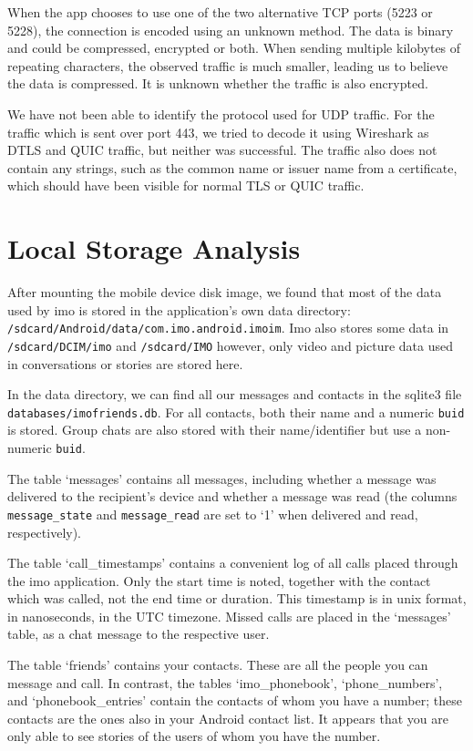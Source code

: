 \documentclass[conference]{IEEEtran}
\begin{document}
When the app chooses to use one of the two alternative TCP ports (5223 or 5228),
the connection is encoded using an unknown method. The data is binary and could
be compressed, encrypted or both. When sending multiple kilobytes of repeating
characters, the observed traffic is much smaller, leading us to believe the
data is compressed. It is unknown whether the traffic is also encrypted.

We have not been able to identify the protocol used for UDP traffic. For the
traffic which is sent over port 443, we tried to decode it using Wireshark as
DTLS and QUIC traffic, but neither was successful. The traffic also does not
contain any strings, such as the common name or issuer name from a certificate,
which should have been visible for normal TLS or QUIC traffic.


\section{Local Storage Analysis}\label{sec:storage}

After mounting the mobile device disk image, we found that most of the data used
by imo is stored in the application's own data directory:
\texttt{/sdcard/Android/data/com.imo.android.imoim}. Imo also stores some data
in \texttt{/sdcard/DCIM/imo} and \texttt{/sdcard/IMO} however, only video and
picture data used in conversations or stories are stored here.

In the data directory, we can find all our messages and contacts in the sqlite3
file \texttt{databases/imofriends.db}. For all contacts, both their name and a
numeric \texttt{buid} is stored. Group chats are also stored with their
name/identifier but use a non-numeric \texttt{buid}.

The table `messages' contains all messages, including whether a message was
delivered to the recipient's device and whether a message was read (the columns
\texttt{message\_state} and \texttt{message\_read} are set to `1' when
delivered and read, respectively).

The table `call\_timestamps' contains a convenient log of all calls placed
through the imo application. Only the start time is noted, together with the
contact which was called, not the end time or duration. This timestamp is in
unix format, in nanoseconds, in the UTC timezone. Missed calls are placed in
the `messages' table, as a chat message to the respective user.

The table `friends' contains your contacts. These are all the people you can
message and call. In contrast, the tables `imo\_phonebook', `phone\_numbers',
and `phonebook\_entries' contain the contacts of whom you have a number; these
contacts are the ones also in your Android contact list. It appears that you
are only able to see stories of the users of whom you have the number.
\end{document}

